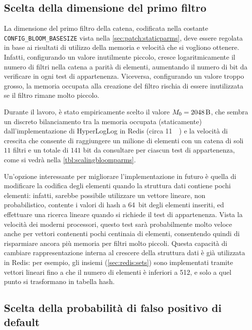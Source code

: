 \subsection{Scelta della dimensione del primo filtro}
\label{sec:patch:basesize}

La dimensione del primo filtro della catena, codificata nella costante \verb|CONFIG_BLOOM_BASESIZE|
vista nella \autoref{sec:patch:staticparms}, deve essere regolata in base ai risultati di utilizzo
della memoria e velocità che si vogliono ottenere. Infatti, configurando un valore inutilmente
piccolo, cresce logaritmicamente il numero di filtri nella catena a parità di elementi, aumentando
il numero di bit da verificare in ogni test di appartenenza. Viceversa, configurando un valore
troppo grosso, la memoria occupata alla creazione del filtro rischia di essere inutilizzata se
il filtro rimane molto piccolo.

Durante il lavoro, è stato empiricamente scelto il valore $M_0 = \SI{2048}{\byte}$, che sembra un
discreto bilanciamento tra la memoria occupata (staticamente) dall'implementazione di HyperLogLog in
Redis (circa \SI{11}{\kibi\byte}) e la velocità di crescita che consente di raggiungere un milione
di elementi con un catena di soli $11$ filtri e un totale di $141$ bit da consultare per ciascun
test di appartenenza, come si vedrà nella \autoref{tbl:scalingbloomparms}.

Un'opzione interessante per migliorare l'implementazione in futuro è quella di modificare la
codifica degli elementi quando la struttura dati contiene pochi elementi: infatti, sarebbe possibile
utilizzare un vettore lineare, non probabilistico, contente i valori di hash a \SI{64}{bit} degli
elementi inseriti, ed effettuare una ricerca lineare quando si richiede il test di appartenenza.
Vista la velocità dei moderni processori, questo test sarà probabilmente molto veloce anche per
vettori contenenti pochi centinaia di elementi, consentendo quindi di risparmiare ancora più memoria
per filtri molto piccoli. Questa capacità di cambiare rappresentazione interna al crescere della
struttura dati è già utilizzata in Redis: per esempio, gli insiemi (\autoref{sec:redis:sets})
sono implementati tramite vettori lineari fino a che il numero di elementi è inferiori a 512, e
solo a quel punto si trasformano in tabella hash.

\subsection{Scelta della probabilità di falso positivo di default}
\label{sec:patch:defaulterror}


